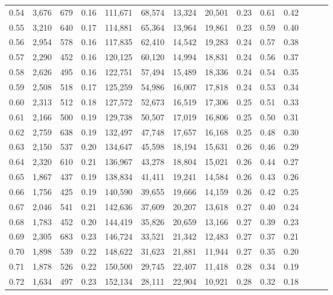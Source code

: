\begin{tabular}{rrrrrrrrrrrrrr}
0.54 &  3,676 &  679 &  0.16 &  111,671 &   68,574 &  13,324 &  20,501 &  0.23 &  0.61 &      0.42 \\
0.55 &  3,210 &  640 &  0.17 &  114,881 &   65,364 &  13,964 &  19,861 &  0.23 &  0.59 &      0.40 \\
0.56 &  2,954 &  578 &  0.16 &  117,835 &   62,410 &  14,542 &  19,283 &  0.24 &  0.57 &      0.38 \\
0.57 &  2,290 &  452 &  0.16 &  120,125 &   60,120 &  14,994 &  18,831 &  0.24 &  0.56 &      0.37 \\
0.58 &  2,626 &  495 &  0.16 &  122,751 &   57,494 &  15,489 &  18,336 &  0.24 &  0.54 &      0.35 \\
0.59 &  2,508 &  518 &  0.17 &  125,259 &   54,986 &  16,007 &  17,818 &  0.24 &  0.53 &      0.34 \\
0.60 &  2,313 &  512 &  0.18 &  127,572 &   52,673 &  16,519 &  17,306 &  0.25 &  0.51 &      0.33 \\
0.61 &  2,166 &  500 &  0.19 &  129,738 &   50,507 &  17,019 &  16,806 &  0.25 &  0.50 &      0.31 \\
0.62 &  2,759 &  638 &  0.19 &  132,497 &   47,748 &  17,657 &  16,168 &  0.25 &  0.48 &      0.30 \\
0.63 &  2,150 &  537 &  0.20 &  134,647 &   45,598 &  18,194 &  15,631 &  0.26 &  0.46 &      0.29 \\
0.64 &  2,320 &  610 &  0.21 &  136,967 &   43,278 &  18,804 &  15,021 &  0.26 &  0.44 &      0.27 \\
0.65 &  1,867 &  437 &  0.19 &  138,834 &   41,411 &  19,241 &  14,584 &  0.26 &  0.43 &      0.26 \\
0.66 &  1,756 &  425 &  0.19 &  140,590 &   39,655 &  19,666 &  14,159 &  0.26 &  0.42 &      0.25 \\
0.67 &  2,046 &  541 &  0.21 &  142,636 &   37,609 &  20,207 &  13,618 &  0.27 &  0.40 &      0.24 \\
0.68 &  1,783 &  452 &  0.20 &  144,419 &   35,826 &  20,659 &  13,166 &  0.27 &  0.39 &      0.23 \\
0.69 &  2,305 &  683 &  0.23 &  146,724 &   33,521 &  21,342 &  12,483 &  0.27 &  0.37 &      0.21 \\
0.70 &  1,898 &  539 &  0.22 &  148,622 &   31,623 &  21,881 &  11,944 &  0.27 &  0.35 &      0.20 \\
0.71 &  1,878 &  526 &  0.22 &  150,500 &   29,745 &  22,407 &  11,418 &  0.28 &  0.34 &      0.19 \\
0.72 &  1,634 &  497 &  0.23 &  152,134 &   28,111 &  22,904 &  10,921 &  0.28 &  0.32 &      0.18 \\

\end{tabular}
